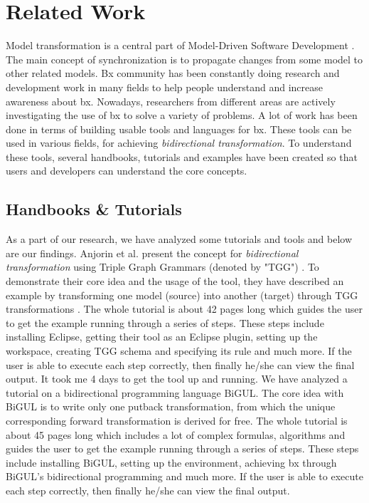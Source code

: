 \section{Related Work}\label{sec:relatedwork}
Model transformation is a central part of Model-Driven Software Development \cite{bx-grace} \cite{bx-dagstuhl}. The main concept of synchronization is to propagate changes from some model to other related models.
\newline\newline Bx community has been constantly doing research and development work in many fields to help people understand and increase awareness about bx.
Nowadays, researchers from different areas are actively investigating the use of bx to solve a variety of problems. A lot of work has been done in terms of building usable tools and languages for bx. These tools can be used in various fields, for achieving \textit{bidirectional transformation}. To understand these tools, several handbooks, tutorials and examples have been created so that users and developers can understand the core concepts. 
\subsection{Handbooks \& Tutorials}\label{subsec:handbook}
As a part of our research, we have analyzed some tutorials and tools and below are our findings.
\newline\newline Anjorin et al.\cite{emoflon-part4} present the concept for \textit{bidirectional transformation} using Triple Graph Grammars (denoted by "TGG") \cite{tgg}. To demonstrate their core idea and the usage of the tool, they have described an example by transforming one model (source) into another (target) through TGG transformations \cite{tgg}\cite{bx-tgg}. The whole tutorial is about 42 pages long which guides the user to get the example running through a series of steps. These steps include installing \ac{Eclipse}, getting their tool as an Eclipse plugin, setting up the workspace, creating TGG schema and specifying its rule and much more. If the user is able to execute each step correctly, then finally he/she can view the final output. It took me 4 days to get the tool up and running.
\newline\newline We have analyzed a tutorial\cite{bigul-tutorial} on a bidirectional programming language BiGUL\cite{bigul}. The core idea with BiGUL is to write only one putback transformation, from which the unique corresponding forward transformation is derived for free. The whole tutorial is about 45 pages long which includes a lot of complex formulas, algorithms and guides the user to get the example running through a series of steps. These steps include installing BiGUL, setting up the environment, achieving bx through BiGUL's bidirectional programming and much more. If the user is able to execute each step correctly, then finally he/she can view the final output. 

